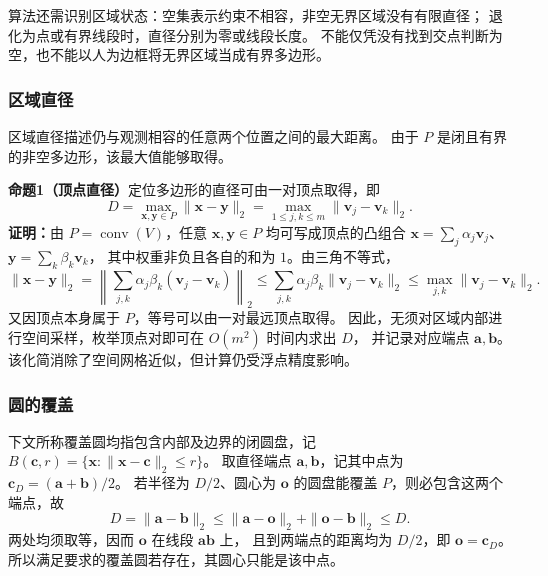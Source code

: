 \documentclass[UTF8,a4paper,12pt]{ctexart}
\begin{document}
算法还需识别区域状态：空集表示约束不相容，非空无界区域没有有限直径；
退化为点或有界线段时，直径分别为零或线段长度。
不能仅凭没有找到交点判断为空，也不能以人为边框将无界区域当成有界多边形。


\subsubsection{区域直径}
\label{sec:q1-diameter}




区域直径描述仍与观测相容的任意两个位置之间的最大距离。
由于 $P$ 是闭且有界的非空多边形，该最大值能够取得。

\noindent\textbf{命题1（顶点直径）}\quad 定位多边形的直径可由一对顶点取得，即
\begin{equation}
  D=\max_{\boldsymbol x,\boldsymbol y\in P}\|\boldsymbol x-\boldsymbol y\|_2
   =\max_{1\leq j,k\leq m}\|\boldsymbol v_j-\boldsymbol v_k\|_2.
  \label{eq:q1-vertex-diameter}
\end{equation}
\noindent\textbf{证明：}由 $P=\operatorname{conv}(V)$，任意 $\boldsymbol x,\boldsymbol y\in P$ 均可写成顶点的凸组合
$\boldsymbol x=\sum_j\alpha_j\boldsymbol v_j$、$\boldsymbol y=\sum_k\beta_k\boldsymbol v_k$，
其中权重非负且各自的和为 $1$。由三角不等式，
\[
  \|\boldsymbol x-\boldsymbol y\|_2
  =\left\|\sum_{j,k}\alpha_j\beta_k(\boldsymbol v_j-\boldsymbol v_k)\right\|_2
  \leq\sum_{j,k}\alpha_j\beta_k\|\boldsymbol v_j-\boldsymbol v_k\|_2
  \leq\max_{j,k}\|\boldsymbol v_j-\boldsymbol v_k\|_2.
\]
又因顶点本身属于 $P$，等号可以由一对最远顶点取得。
因此，无须对区域内部进行空间采样，枚举顶点对即可在 $O(m^2)$ 时间内求出 $D$，
并记录对应端点 $\boldsymbol a,\boldsymbol b$。该化简消除了空间网格近似，但计算仍受浮点精度影响。


\subsubsection{圆的覆盖}
\label{sec:q1-cover-counterexample}
\label{sec:q1-cover-condition}




下文所称覆盖圆均指包含内部及边界的闭圆盘，记
$B(\boldsymbol c,r)=\{\boldsymbol x:\|\boldsymbol x-\boldsymbol c\|_2\leq r\}$。
取直径端点 $\boldsymbol a,\boldsymbol b$，记其中点为 $\boldsymbol c_D=(\boldsymbol a+\boldsymbol b)/2$。
若半径为 $D/2$、圆心为 $\boldsymbol o$ 的圆盘能覆盖 $P$，则必包含这两个端点，故
\[
  D=\|\boldsymbol a-\boldsymbol b\|_2
  \leq\|\boldsymbol a-\boldsymbol o\|_2+\|\boldsymbol o-\boldsymbol b\|_2\leq D.
\]
两处均须取等，因而 $\boldsymbol o$ 在线段 $\boldsymbol a\boldsymbol b$ 上，
且到两端点的距离均为 $D/2$，即 $\boldsymbol o=\boldsymbol c_D$。
所以满足要求的覆盖圆若存在，其圆心只能是该中点。
\end{document}
